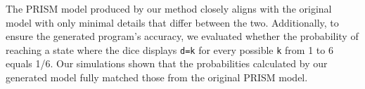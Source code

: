 The PRISM model produced by our method closely aligns with the original model with only minimal details that differ between the two.
Additionally, to ensure the generated program's accuracy, 
we evaluated whether the probability of reaching a state where the dice displays \texttt{d=k} for every possible \texttt{k} from 1 to 6 equals 1/6. Our simulations shown that the probabilities calculated by our generated model fully matched those from the original PRISM model. 

\begin{comment}
\subsection{Simple Peer-To-Peer Protocol}
This case study describes a simple peer-to-peer protocol based on BitTorrent\footnote{\url{https://www.prismmodelchecker.org/casestudies/peer2peer.php}}. The model comprises a set of clients trying to download a file that has been partitioned into $K$ blocks. Initially, there is one client that has already obtained all of the blocks and $N$ additional clients with no blocks. Each client can download a block from any of the others but they can only attempt four concurrent downloads for each block.\\
The code we analyze with $k=5$ and $N=4$ is reported in Listing \ref{ex2-code}.
\begin{lstlisting}[style=chor-color,caption={Choreographic language for the Peer-To-Peer Protocol.},captionpos=b,label={ex2-code}]
preamble
"ctmc"
"const double mu=2;"
"formula rate1=mu*(1+min(3,b11+b21+b31+b41));"
"formula rate2=mu*(1+min(3,b12+b22+b32+b42));"
"formula rate3=mu*(1+min(3,b13+b23+b33+b43));"
"formula rate4=mu*(1+min(3,b14+b24+b34+b44));"
"formula rate5=mu*(1+min(3,b15+b25+b35+b45));"
endpreamble

n = 4;
n = 4;

Client[i] $\rightarrow$ i in [1...n]
Client[i] : "b[i]1 : [0..1];", "b[i]2 : [0..1];", "b[i]3 : [0..1];", "b[i]4 : [0..1];", "b[i]5 : [0..1];" ;

{
PeerToPeer := Client[i] $\rightarrow$ Client[i]: 
			(+["rate1*1"]  "(b[i]1'=1)"$\&\&$" " . PeerToPeer
			 +["rate2*1"]  "(b[i]2'=1)"$\&\&$" " . PeerToPeer
			 +["rate3*1"]  "(b[i]3'=1)"$\&\&$" " . PeerToPeer
			 +["rate4*1"]  "(b[i]4'=1)"$\&\&$" " . PeerToPeer
			 +["rate5*1"]  "(b[i]5'=1)"$\&\&$" " . PeerToPeer)
}
	
\end{lstlisting}

Part of the generated PRISM code is shown in Listing \ref{ex2-gen} and it is faithful with what reported in the PRISM documentation. 
\begin{lstlisting}[style=prism-color,caption={Generated PRISM program for the Peer-To-Peer Protocol.},captionpos=b,label={ex2-gen}]
ctmc
const double mu=2;
formula rate1=mu*(1+min(3,b11+b21+b31+b41));
formula rate2=mu*(1+min(3,b12+b22+b32+b42));
formula rate3=mu*(1+min(3,b13+b23+b33+b43));
formula rate4=mu*(1+min(3,b14+b24+b34+b44));
formula rate5=mu*(1+min(3,b15+b25+b35+b45));


\end{comment}
